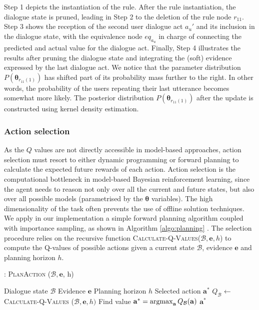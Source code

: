 Step 1 depicts the instantiation of the rule. After the rule instantiation, the dialogue state is pruned, leading in Step 2 to the deletion of the rule node $r_{11}$.  Step 3 shows the reception of the second user dialogue act $a_u'$ and its inclusion in the dialogue state, with the equivalence node $eq_{a_u}$ in charge of connecting the predicted and actual value for the dialogue act. Finally, Step 4 illustrates the results after pruning the dialogue state and integrating the (soft) evidence expressed by the last dialogue act. We notice that the parameter distribution $P(\boldsymbol\theta_{r_{11}(1)})$ has shifted part of its probability mass further to the right. In other words, the probability of the users repeating their last utterance becomes somewhat more likely. The posterior distribution $P(\boldsymbol\theta_{r_{11}(1)})$ after the update is constructed using kernel density estimation. 

\subsubsection*{Action selection}

 As the $Q$ values are not directly accessible in model-based approaches, action selection must resort to either dynamic programming or forward planning to calculate the expected future rewards of each action.  Action selection is the computational bottleneck in model-based Bayesian reinforcement learning, since the agent needs to reason not only over all the current and future states, but also over all possible models (parametrised by the $\boldsymbol\theta$ variables).  The high dimensionality of the task often prevents the use of offline solution techniques. We apply in our implementation a simple forward planning algorithm coupled with importance sampling, as shown in Algorithm \ref{algo:planning} . The selection procedure relies on the recursive function \textsc{Calculate-Q-Values}($\mathcal{B}, \mathbf{e}, h$) to compute the Q-values of possible actions given a current state $\mathcal{B}$, evidence $\mathbf{e}$ and planning horizon $h$.  

\begin{algorithm}[h!]
\caption{: \textsc{PlanAction} ($\mathcal{B}, \mathbf{e}$, h) }
\begin{algorithmic}[1] \vspace{1mm}
\REQUIRE Dialogue state $\mathcal{B}$
\REQUIRE Evidence $\mathbf{e}$
\REQUIRE Planning horizon $h$
\ENSURE Selected action $\mathbf{a}^*$
\STATE $Q_{\mathcal{B}} \leftarrow $ \textsc{Calculate-Q-Values} ($\mathcal{B}, \mathbf{e}, h)$
\STATE Find value $\mathbf{a}^* = \argmax_{\mathbf{a}} Q_{\mathcal{B}}(\mathbf{a})$
\RETURN $\mathbf{a}^*$
\end{algorithmic}
\label{algo:planning}
\end{algorithm}


